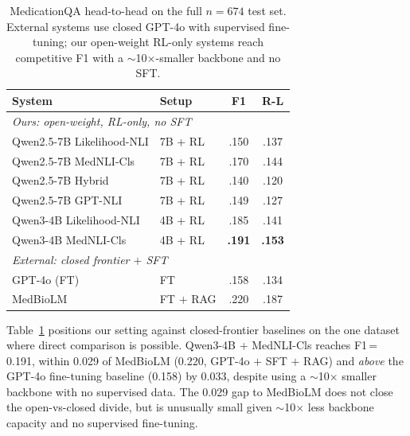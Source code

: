 \documentclass[11pt]{article}
\begin{document}
\begin{table}[t]
\centering\small
\setlength{\tabcolsep}{4pt}
\renewcommand{\arraystretch}{1.05}
\begin{tabular}{@{}llcc@{}}
\toprule
\textbf{System} & \textbf{Setup} & \textbf{F1} & \textbf{R-L} \\
\midrule
\multicolumn{4}{l}{\textit{Ours: open-weight, RL-only, no SFT}} \\
Qwen2.5-7B  Likelihood-NLI & 7B + RL    & .150           & .137 \\
Qwen2.5-7B  MedNLI-Cls     & 7B + RL    & .170           & .144 \\
Qwen2.5-7B  Hybrid         & 7B + RL    & .140           & .120 \\
Qwen2.5-7B  GPT-NLI        & 7B + RL    & .149           & .127 \\
Qwen3-4B    Likelihood-NLI & 4B + RL    & .185           & .141 \\
Qwen3-4B    MedNLI-Cls     & 4B + RL    & \textbf{.191}  & \textbf{.153} \\
\midrule
\multicolumn{4}{l}{\textit{External: closed frontier $+$ SFT}} \\
GPT-4o (FT) \citep{kim2025medbiolm}      & FT          & .158  & .134 \\
MedBioLM    \citep{kim2025medbiolm}      & FT $+$ RAG  & .220  & .187 \\
\bottomrule
\end{tabular}
\caption{MedicationQA head-to-head on the full 
$n{=}674$ test set. External systems use closed 
GPT-4o with supervised fine-tuning; our open-weight 
RL-only systems reach competitive F1 with a 
$\sim$10$\times$-smaller backbone and no SFT.
}
\label{tab:sota_medicationqa}
\end{table}
Table~\ref{tab:sota_medicationqa} positions our setting against closed-frontier baselines on the one dataset where direct comparison is possible. Qwen3-4B + MedNLI-Cls reaches F1\,=\,0.191, within 0.029 of MedBioLM (0.220, GPT-4o $+$ SFT $+$ RAG) and \emph{above} the GPT-4o fine-tuning baseline (0.158) by 0.033, despite using a $\sim$10$\times$ 
smaller backbone with no supervised data. The 0.029 gap to MedBioLM does not close the open-vs-closed  divide, but is unusually small given $\sim$10$\times$ less backbone capacity and no supervised fine-tuning.
\end{document}
